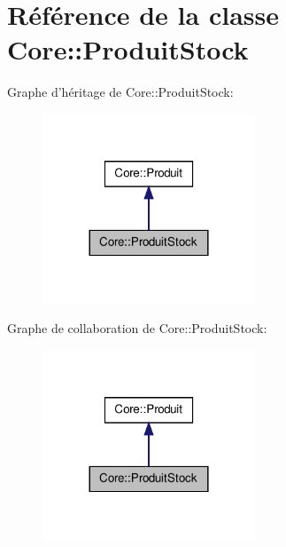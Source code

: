 \hypertarget{class_core_1_1_produit_stock}{
\section{Référence de la classe Core::ProduitStock}
\label{d6/d92/class_core_1_1_produit_stock}
}


Graphe d'héritage de Core::ProduitStock:\nopagebreak
\begin{figure}[H]
\begin{center}
\leavevmode
\includegraphics[width=180pt]{d2/dee/class_core_1_1_produit_stock__inherit__graph}
\end{center}
\end{figure}


Graphe de collaboration de Core::ProduitStock:\nopagebreak
\begin{figure}[H]
\begin{center}
\leavevmode
\includegraphics[width=180pt]{d7/d71/class_core_1_1_produit_stock__coll__graph}
\end{center}
\end{figure}
